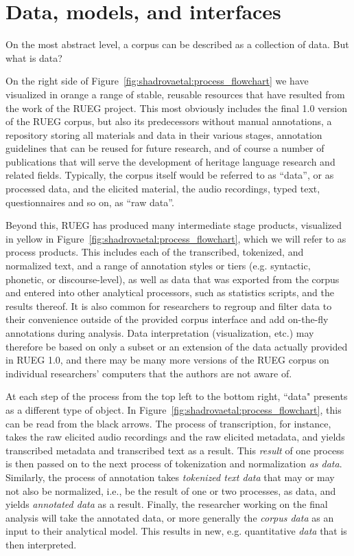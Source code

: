 \documentclass[output=paper,colorlinks,citecolor=brown]{langscibook}
\begin{document}

\section{Data, models, and interfaces} \label{sec:shadrovaetal:models}

On the most abstract level, a corpus can be described as a collection of data. But what is data?

On the right side of Figure~\ref{fig:shadrovaetal:process_flowchart} we have visualized in orange a range of stable, reusable resources that have resulted from the work of the RUEG project. This most obviously includes the final 1.0 version of the RUEG corpus, but also its predecessors without manual annotations, a repository storing all materials and data in their various stages, annotation guidelines that can be reused for future research, and of course a number of publications that will serve the development of heritage language research and related fields. Typically, the corpus itself would be referred to as ``data'', or as processed data, and the elicited material, the audio recordings, typed text, questionnaires and so on, as ``raw data''. 

Beyond this, RUEG has produced many intermediate stage products, visualized in yellow in Figure~\ref{fig:shadrovaetal:process_flowchart}, which we will refer to as process products. This includes each of the transcribed, tokenized, and normalized text, and a range of annotation styles or tiers (e.g. syntactic, phonetic, or discourse-level), as well as data that was exported from the corpus and entered into other analytical processors, such as statistics scripts, and the results thereof.
It is also common for researchers to regroup and filter data to their convenience outside of the provided corpus interface and add on-the-fly annotations during analysis. Data interpretation (visualization, etc.) may therefore be based on only a subset or an extension of the data actually provided in RUEG 1.0, and there may be many more versions of the RUEG corpus on individual researchers' computers that the authors are not aware of. 

At each step of the process from the top left to the bottom right, ``data" presents as a different type of object. In Figure~\ref{fig:shadrovaetal:process_flowchart}, this can be read from the black arrows. The process of transcription, for instance, takes the raw elicited audio recordings and the raw elicited metadata, and yields transcribed metadata and transcribed text as a result. This \textit{result} of one process is then passed on to the next process of tokenization and normalization \textit{as data}. Similarly, the process of annotation takes \textit{tokenized text data} that may or may not also be normalized, i.e., be the result of one or two processes, as data, and yields \textit{annotated data} as a result. Finally, the researcher working on the final analysis will take the annotated data, or more generally the \textit{corpus data} as an input to their analytical model. This results in new, e.g. quantitative \textit{data} that is then interpreted. 
\end{document}
